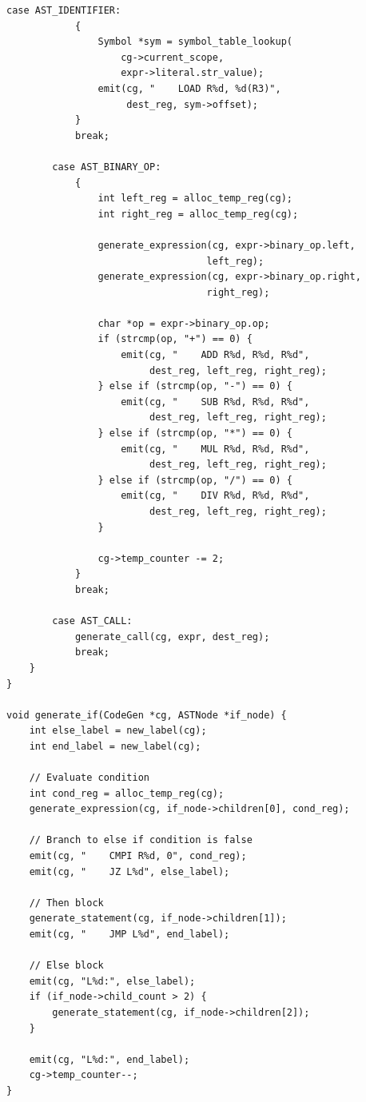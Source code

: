 \documentclass[12pt,a4paper,oneside]{book}
\begin{document}
\begin{lstlisting}[style=c, caption={Code Generator}]
        case AST_IDENTIFIER:
            {
                Symbol *sym = symbol_table_lookup(
                    cg->current_scope, 
                    expr->literal.str_value);
                emit(cg, "    LOAD R%d, %d(R3)", 
                     dest_reg, sym->offset);
            }
            break;
            
        case AST_BINARY_OP:
            {
                int left_reg = alloc_temp_reg(cg);
                int right_reg = alloc_temp_reg(cg);
                
                generate_expression(cg, expr->binary_op.left, 
                                   left_reg);
                generate_expression(cg, expr->binary_op.right, 
                                   right_reg);
                
                char *op = expr->binary_op.op;
                if (strcmp(op, "+") == 0) {
                    emit(cg, "    ADD R%d, R%d, R%d", 
                         dest_reg, left_reg, right_reg);
                } else if (strcmp(op, "-") == 0) {
                    emit(cg, "    SUB R%d, R%d, R%d", 
                         dest_reg, left_reg, right_reg);
                } else if (strcmp(op, "*") == 0) {
                    emit(cg, "    MUL R%d, R%d, R%d", 
                         dest_reg, left_reg, right_reg);
                } else if (strcmp(op, "/") == 0) {
                    emit(cg, "    DIV R%d, R%d, R%d", 
                         dest_reg, left_reg, right_reg);
                }
                
                cg->temp_counter -= 2;
            }
            break;
            
        case AST_CALL:
            generate_call(cg, expr, dest_reg);
            break;
    }
}

void generate_if(CodeGen *cg, ASTNode *if_node) {
    int else_label = new_label(cg);
    int end_label = new_label(cg);
    
    // Evaluate condition
    int cond_reg = alloc_temp_reg(cg);
    generate_expression(cg, if_node->children[0], cond_reg);
    
    // Branch to else if condition is false
    emit(cg, "    CMPI R%d, 0", cond_reg);
    emit(cg, "    JZ L%d", else_label);
    
    // Then block
    generate_statement(cg, if_node->children[1]);
    emit(cg, "    JMP L%d", end_label);
    
    // Else block
    emit(cg, "L%d:", else_label);
    if (if_node->child_count > 2) {
        generate_statement(cg, if_node->children[2]);
    }
    
    emit(cg, "L%d:", end_label);
    cg->temp_counter--;
}
\end{lstlisting}
\end{document}
